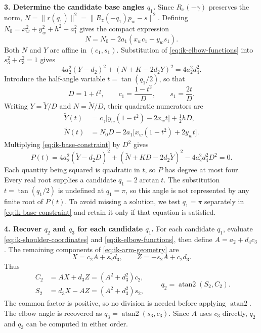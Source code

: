 \textbf{3. Determine the candidate base angles $q_1$.}
Since $R_x(-\gamma)$ preserves the norm,
$N=\|r(q_1)\|^2=\|R_z(-q_1)p_w-s\|^2$. Defining
$N_0=x_w^2+y_w^2+h^2+a_1^2$ gives the compact expression
\begin{equation}
 N=N_0-2a_1(x_wc_1+y_ws_1).
 \label{eq:ik-norm-affine}
\end{equation}
Both $N$ and $Y$ are affine in $(c_1,s_1)$. Substitution of
\eqref{eq:ik-elbow-functions} into $s_3^2+c_3^2=1$ gives
\begin{equation}
 4a_2^2(Y-d_2)^2+(N+K-2d_2Y)^2=4a_2^2d_4^2.
 \label{eq:ik-base-constraint}
\end{equation}
Introduce the half-angle variable $t=\tan(q_1/2)$, so that
\begin{equation}
 D=1+t^2,\qquad c_1=\frac{1-t^2}{D},\qquad s_1=\frac{2t}{D}.
 \label{eq:ik-half-angle}
\end{equation}
Writing $Y=\widetilde Y/D$ and $N=\widetilde N/D$, their quadratic numerators are
\begin{equation}
 \begin{aligned}
 \widetilde Y(t)&=c_\gamma\bigl[y_w(1-t^2)-2x_wt\bigr]+\tfrac12hD,\\
 \widetilde N(t)&=N_0D-2a_1\bigl[x_w(1-t^2)+2y_wt\bigr].
 \end{aligned}
 \label{eq:ik-polynomial-numerators}
\end{equation}
Multiplying \eqref{eq:ik-base-constraint} by $D^2$ gives
\begin{equation}
 \boxed{P(t)=4a_2^2(\widetilde Y-d_2D)^2
       +(\widetilde N+KD-2d_2\widetilde Y)^2
       -4a_2^2d_4^2D^2=0.}
 \label{eq:ik-quartic}
\end{equation}
Each quantity being squared is quadratic in $t$, so $P$ has degree at most four.
Every real root supplies a candidate $q_1=2\arctan t$.
The substitution $t=\tan(q_1/2)$ is undefined at $q_1=\pi$, so this angle is not
represented by any finite root of $P(t)$. To avoid missing a solution, we test
$q_1=\pi$ separately in \eqref{eq:ik-base-constraint} and retain it only if that
equation is satisfied.

\textbf{4. Recover $q_2$ and $q_3$ for each candidate $q_1$.}
For each candidate $q_1$, evaluate \eqref{eq:ik-shoulder-coordinates} and
\eqref{eq:ik-elbow-functions}, then define $A=a_2+d_4c_3$.
The remaining components of \eqref{eq:ik-arm-geometry} are
\begin{equation}
 X=c_2A+s_2d_3,\qquad Z=-s_2A+c_2d_3.
 \label{eq:ik-shoulder-components}
\end{equation}
Thus
\begin{equation}
 \begin{aligned}
 C_2&=AX+d_3Z=(A^2+d_3^2)c_2,\\
 S_2&=d_3X-AZ=(A^2+d_3^2)s_2,
 \end{aligned}
 \qquad q_2=\operatorname{atan2}(S_2,C_2).
 \label{eq:ik-shoulder-recovery}
\end{equation}
The common factor is positive, so no division is needed
before applying $\operatorname{atan2}$. The elbow angle is recovered as
$q_3=\operatorname{atan2}(s_3,c_3)$. Since $A$ uses $c_3$ directly, $q_2$ and $q_3$
can be computed in either order.

